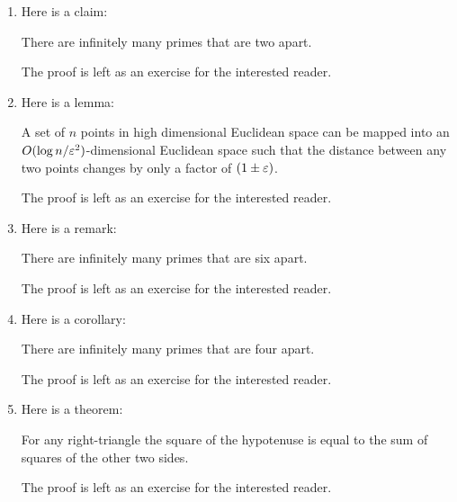 \documentclass{article}
\begin{document}
\begin{enumerate}
  [
    leftmargin={*},
    label={\arabic*.},
    font={\bf},
    labelsep={10pt},
    itemsep={20pt},
    ref={\arabic*}
  ]
  \item \label{qst:1}
    Here is a claim:
    \begin{claim}\label{clm:1}
      There are infinitely many primes that are two apart.
    \end{claim}
    \begin{proof*}
      The proof is left as an exercise for the interested reader.
    \end{proof*}

  \item \label{qst:2}
    Here is a lemma:
    \begin{lemma}\label{lma:1}
      A set of $n$ points in high dimensional Euclidean space can
      be mapped into an $O(\log n/\varepsilon^2)$-dimensional Euclidean
      space such that the distance between any two points changes
      by only a factor of $(1 \pm \varepsilon)$.
    \end{lemma}
    \begin{proof*}
      The proof is left as an exercise for the interested reader.
    \end{proof*}

  \item \label{qst:3}
    Here is a remark:
    \begin{remark}\label{rmk:1}
      There are infinitely many primes that are six apart.
    \end{remark}
    \begin{proof*}
      The proof is left as an exercise for the interested reader.
    \end{proof*}
  
  \item \label{qst:4}
    Here is a corollary:
    \begin{corollary}\label{cor:1}
      There are infinitely many primes that are four apart.
    \end{corollary}
    \begin{proof*}
      The proof is left as an exercise for the interested reader.
    \end{proof*}

  \item \label{qst:5}
    Here is a theorem:
    \begin{theorem}\label{thm:1}
      For any right-triangle the square of the hypotenuse is equal
      to the sum of squares of the other two sides.
    \end{theorem}
    \begin{proof*}
      The proof is left as an exercise for the interested reader.
    \end{proof*}


\end{enumerate}
\end{document}
